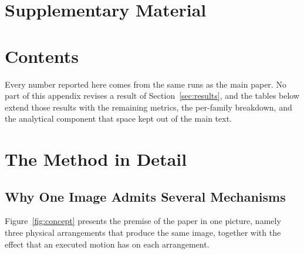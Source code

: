 \documentclass{article} %
\theoremstyle{defstyle}
\theoremstyle{plain}
\begin{document}



\clearpage
\clearpage
\appendix
\section*{Supplementary Material}

\makeatletter
\let\supp@addcontentsline\addcontentsline
\def\supp@toc{toc}
\renewcommand\addcontentsline[3]{%
  \begingroup
    \def\supp@arg{#1}%
    \ifx\supp@arg\supp@toc
      \endgroup\supp@addcontentsline{stoc}{#2}{#3}%
    \else
      \endgroup\supp@addcontentsline{#1}{#2}{#3}%
    \fi}
\begingroup
  \renewcommand{\contentsname}{\normalsize Contents}
  \setlength{\parskip}{0pt}
  \setcounter{tocdepth}{2}
  \footnotesize
  \section*{\contentsname}
\endgroup
\makeatother
\bigskip


Every number reported here comes from the same runs as the main paper. No part of this
appendix revises a result of Section~\ref{sec:results}, and the tables below extend those
results with the remaining metrics, the per-family breakdown, and the analytical component
that space kept out of the main text.

\section{The Method in Detail}

\subsection{Why One Image Admits Several Mechanisms}
\label{sec:supp-concept}

Figure~\ref{fig:concept} presents the premise of the paper in one picture, namely three
physical arrangements that produce the same image, together with the effect that an
executed motion has on each arrangement.
\end{document}
